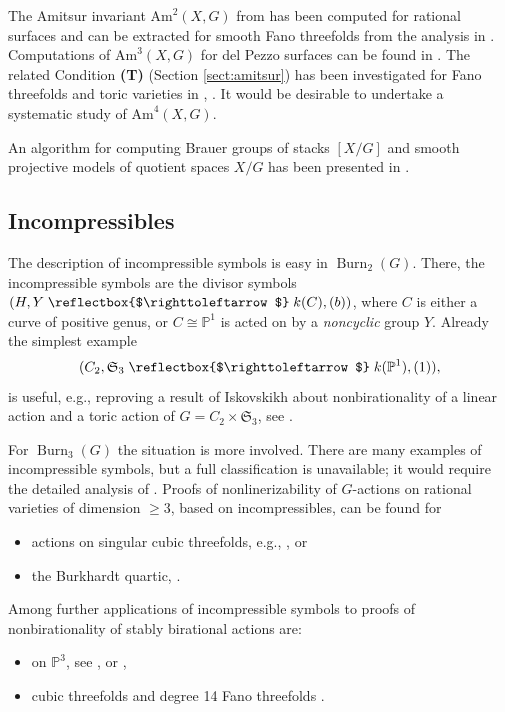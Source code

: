 \documentclass[12pt,reqno]{amsart}
\theoremstyle{plain}
\theoremstyle{remark}
\theoremstyle{definition}
\numberwithin{equation}{section}
\newcommand{\bP}{{\mathbb P}}
\newcommand{\Am}{\mathrm{Am}}
\newcommand{\fS}{{\mathfrak S}}
\newcommand{\actsfromleft}{\mathrel{\reflectbox{$\righttoleftarrow$}}}
\DeclareMathOperator{\Burn}{Burn}
\begin{document}
The Amitsur invariant $\Am^2(X,G)$ from \cite[Sect.\ 6]{blancfinite} has been computed for rational surfaces \cite[Prop. 6.7]{blancfinite} and can be extracted for smooth Fano threefolds
from the analysis in  \cite{sharma}. 
Computations of $\Am^3(X,G)$ for del Pezzo surfaces can be found in \cite{TZ-uni}.
The related Condition {\bf (T)} (Section \ref{sect:amitsur}) has been investigated for Fano threefolds and toric varieties in \cite{KT-uni}, \cite{TZ-toric}. It would be desirable to undertake a systematic study of $\Am^4(X,G)$. 

An algorithm for computing Brauer groups of stacks $[X/G]$ and smooth projective models of quotient spaces $X/G$ has been presented in \cite{KT-quotient}. 






\subsection*{Incompressibles}


The description of incompressible symbols is easy in $\Burn_2(G)$.
There, the incompressible symbols are the divisor symbols 
$(H,Y\actsfromleft k(C),(b))$,
where $C$ is either a curve of positive genus, or $C\cong \bP^1$ is acted on by a \emph{noncyclic} group $Y$.
Already the simplest example
$$
(C_2, \fS_3\actsfromleft k(\bP^1),(1)), 
$$
is useful, e.g., reproving a result of Iskovskikh \cite{isk-s3} about nonbirationality of a linear action and a toric action of $G=C_2\times \fS_3$, see \cite[\S 7.6]{HKTsmall}.


For $\Burn_3(G)$ the situation is more involved.
There are many examples of incompressible symbols, but a full classification is unavailable; it would require the detailed analysis of \cite{DI}. 
Proofs of nonlinerizability of $G$-actions on rational varieties of dimension $\ge 3$, based on incompressibles, can be found for 
\begin{itemize}
\item actions on singular cubic threefolds, e.g., \cite[Exa.\ 2.7]{CTZ-forum}, or
\item the Burkhardt quartic, \cite[Prop.\ 7.2]{CTZ-burk}.
\end{itemize}
Among further applications of incompressible symbols to proofs of nonbirationality of stably birational actions are:
\begin{itemize}
\item on $\bP^3$, see \cite[Thm.\ 11.2]{KT-vector}, or \cite[Exa.\ 8.1]{TYZ-survey}, 
\item 
cubic threefolds and degree 14 Fano threefolds \cite{TZ-14}.
\end{itemize}
\end{document}
